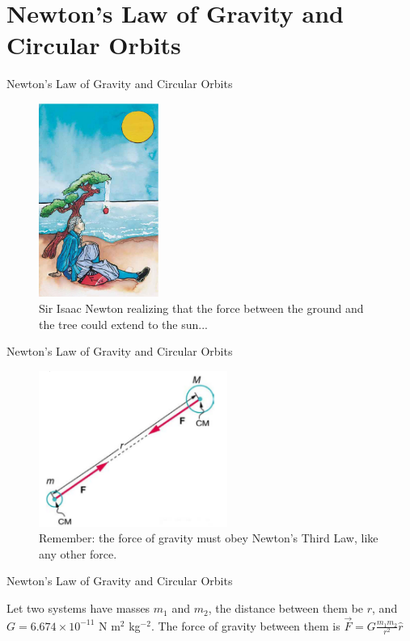 \documentclass{beamer}
\begin{document}
\section{Newton's Law of Gravity and Circular Orbits}

\begin{frame}{Newton's Law of Gravity and Circular Orbits}
\begin{figure}
\centering
\includegraphics[width=0.35\textwidth]{figures/newton.png}
\caption{\label{fig:apple} Sir Isaac Newton realizing that the force between the ground and the tree could extend to the sun...}
\end{figure}
\end{frame}

\begin{frame}{Newton's Law of Gravity and Circular Orbits}
\begin{figure}
\centering
\includegraphics[width=0.55\textwidth]{figures/third.png}
\caption{\label{fig:third} Remember: the force of gravity must obey Newton's Third Law, like any other force.}
\end{figure}
\end{frame}

\begin{frame}{Newton's Law of Gravity and Circular Orbits}
\begin{tcolorbox}[colback=white,colframe=red!40!blue,title=Newton's Law of Gravitation]
\alert{Let two systems have masses $m_1$ and $m_2$, the distance between them be $r$, and $G = 6.674\times 10^{-11}$ N m$^2$ kg$^{-2}$.  The force of gravity between them is}\vspace{0.2cm}
\alert{$\vec{F} = G\frac{m_1 m_2}{r^2}\hat{r}$}
\end{tcolorbox}
\end{frame}
\end{document}
